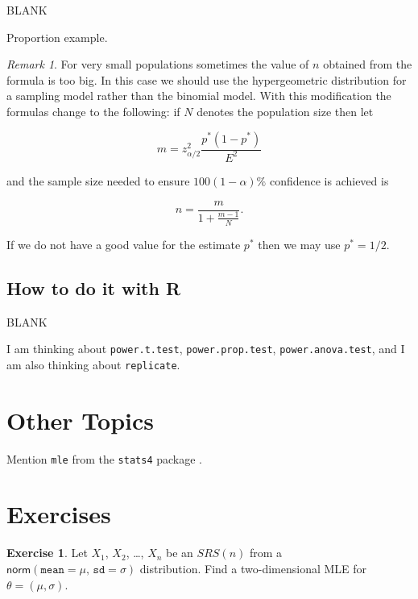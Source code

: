 \documentclass[]{book}
\numberwithin{equation}{chapter}
\numberwithin{figure}{chapter}
\theoremstyle{plain}
\theoremstyle{definition}
\newtheorem{xca}{Exercise}[chapter]
\theoremstyle{remark}
\theoremstyle{definition}
\theoremstyle{definition}
\theoremstyle{remark}
\newtheorem*{remark}{Remark}
\begin{document}
BLANK

Proportion example.

\bigskip

\begin{remark}
For very small populations sometimes the value of \(n\) obtained from
the formula is too big. In this case we should use the hypergeometric
distribution for a sampling model rather than the binomial model. With
this modification the formulas change to the following: if \(N\) denotes
the population size then let

\begin{equation}
m=z_{\alpha/2}^{2}\frac{p^{\ast}(1-p^{\ast})}{E^{2}}
\end{equation}

and the sample size needed to ensure \(100(1-\alpha)\%\) confidence is
achieved is

\begin{equation}
n=\frac{m}{1+\frac{m-1}{N}}.
\end{equation}

If we do not have a good value for the estimate \(p^{\ast}\) then we may
use \(p^{\ast}=1/2\).
\end{remark}

\subsection{How to do it with R}\label{how-to-do-it-with-r-39}

BLANK

I am thinking about \texttt{power.t.test}, \texttt{power.prop.test},
\texttt{power.anova.test}, and I am also thinking about
\texttt{replicate}.

\section{Other Topics}\label{sec-other-topics}

Mention \texttt{mle} from the \texttt{stats4} package \autocite{stats4}.

\section{Exercises}\label{exercises-7}

\begin{xca}
Let \(X_{1}\), \(X_{2}\), \ldots{}, \(X_{n}\) be an \(SRS(n)\) from a
\(\mathsf{norm}(\mathtt{mean} = \mu, \, \mathtt{sd} = \sigma)\)
distribution. Find a two-dimensional MLE for \(\theta=(\mu,\sigma)\).
\end{xca}
\end{document}
